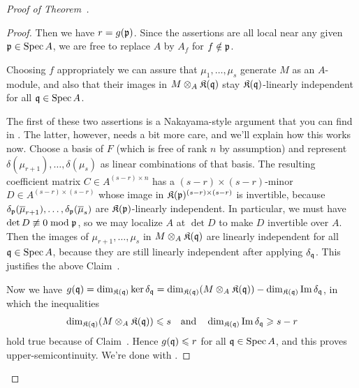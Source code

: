 \documentclass[a4paper,parskip=half,numbers=enddot, DIV=12]{scrreprt}
\renewcommand{\geq}{\geqslant}
\renewcommand{\leq}{\leqslant}
\begin{document}
\begin{proof}[Proof of Theorem~]
\begin{proof}
		Then we have $r=g(\mathfrak{p})$. Since the assertions are all local near any given $\mathfrak{p}\in\operatorname{Spec} A$, we are free to replace $A$ by $A_f$ for $f\notin\mathfrak{p}$.
		\begin{claim}
			Choosing $f$ appropriately we can assure that $\mu_1,\ldots,\mu_s$ generate $M$ as an $A$-module, and also that their images in $M\otimes_A\mathfrak{K}(\mathfrak{q})$ stay $\mathfrak{K}(\mathfrak{q})$-linearly independent for all $\mathfrak{q}\in\operatorname{Spec} A$. 
		\end{claim}
		The first of these two assertions is a Nakayama-style argument that you can find in  \cite[Lemma~1.5.1]{alg2}. The latter, however, needs a bit more care, and we'll explain how this works now. Choose a basis of $F$ (which is free of rank $n$ by assumption) and represent $\delta(\mu_{r+1}),\ldots,\delta(\mu_s)$ as linear combinations of that basis. The resulting coefficient matrix $C\in A^{(s-r)\times n}$ has a $(s-r)\times (s-r)$-minor $D\in A^{(s-r)\times (s-r)}$ whose image in $\mathfrak{K}(\mathfrak{p})^{(s-r)\times (s-r)}$ is invertible, because $\delta_{\mathfrak{p}}(\overline{\mu}_{r+1}),\ldots,\delta_{\mathfrak{p}}(\overline{\mu}_s)$ are $\mathfrak{K}(\mathfrak{p})$-linearly independent. In particular, we must have $\operatorname{det} D\not\equiv 0\bmod \mathfrak{p}$, so we may localize $A$ at $\det D$ to make $D$ invertible over $A$. Then the images of $\mu_{r+1},\ldots,\mu_s$ in $M\otimes_A\mathfrak{K}(\mathfrak{q})$ are linearly independent for all $\mathfrak{q}\in\operatorname{Spec} A$, because they are still linearly independent after applying $\delta_{\mathfrak{q}}$. This justifies the above Claim~.
		
		Now we have $g(\mathfrak{q})=\dim_{\mathfrak{K}(\mathfrak{q})}\ker\delta_{\mathfrak{q}}=\dim_{\mathfrak{K}(\mathfrak{q})}(M\otimes_A\mathfrak{K}(\mathfrak{q}))-\dim_{\mathfrak{K}(\mathfrak{q})}\operatorname{Im}\delta_{\mathfrak{q}}$, in which the inequalities
		\begin{align}\lbl{eq:dimIneqs}
			\dim_{\KK(\qq)}(M\otimes_A\KK(\qq))\leq s\quad\text{and}\quad\dim_{\KK(\qq)}\Im\delta_\qq\geq s-r
		\end{align}
		hold true because of Claim~. Hence $g(\qq)\leq r$ for all $\mathfrak{q}\in\operatorname{Spec} A$, and this proves upper-semicontinuity. We're done with .
		

\end{proof}
\end{proof}
\end{document}
